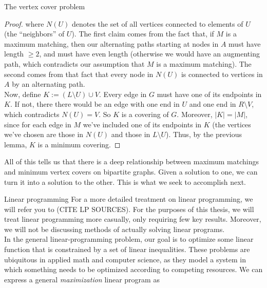 \documentclass[11pt]{article}
\renewcommand{\'}{^{'}}
\begin{document}
\begin{section}{The vertex cover problem}
\begin{proof}
		where $N(U)$ denotes the set of all vertices connected to elements of $U$ (the 
		``neighbors'' of $U$). The first claim comes from the fact that, if $M$ is a 
		maximum matching, then our alternating paths starting at nodes in $A$ must have 
		length $\geq 2$, and must have even length (otherwise we would have an augmenting path, 
		which contradicts our assumption that $M$ is a maximum matching).
		The second comes from that fact that every node in $N(U)$ is connected to vertices in 
		$A$ by an alternating path. \\
		Now, define $K := (L\setminus U)\cup V$. Every edge 
		in $G$ must have one of its endpoints in $K$. If not, there there would be an 
		edge with one end in $U$ and one end in $R\setminus V$, which contradicts 
		$N(U) = V$. So $K$ is a covering of $G$. Moreover, $|K| = |M|$, since for each 
		edge in $M$ we've included one of its endpoints in $K$ (the vertices we've chosen are 
		those in $N(U)$ and those in $L\setminus U$). Thus, by the previous lemma, $K$ is 
		a minimum covering.
	\end{proof}

	All of this tells us that there is a deep relationship between maximum matchings and 
	minimum vertex covers on bipartite graphs. Given a solution to one, we can turn it into a 
	solution to the other. This is what we seek to accomplish next. 
\end{section}

\begin{section}{Linear programming}
	For a more detailed treatment on linear programming, we will refer you to (CITE LP SOURCES).
	For the purposes of this thesis, we will treat linear programming more casually, only requiring 
	few key results. Moreover, we will not be discussing methods of actually solving linear 
	programs. \\
	In the general linear-programming problem, our goal is to optimize some linear function that 
	is constrained by a set of linear inequalities. These problems are ubiquitous in applied math 
	and computer science, as they model a system in which something needs to be optimized according 
	to competing resources. We can express a general \emph{maximization} linear program as
	
		


\end{section}
\end{document}

